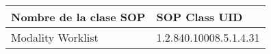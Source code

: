 \begin{tabular}{|l|l|}
\hline
\textbf{Nombre de la clase SOP} & \textbf{SOP Class UID} \\ \hline
Modality Worklist               & 1.2.840.10008.5.1.4.31 \\ \hline
\end{tabular}
